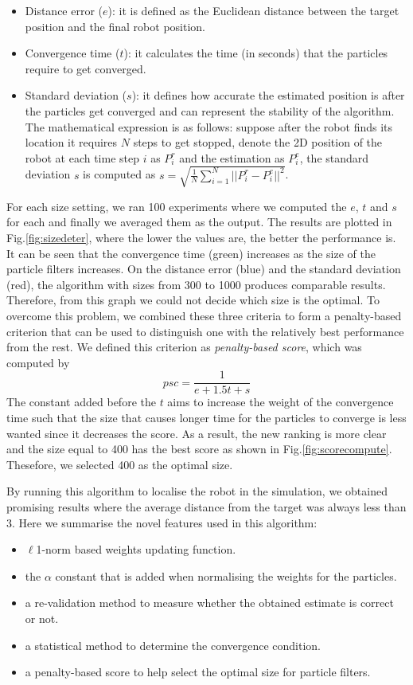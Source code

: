 \begin{itemize}
  \item Distance error ($e$): it is defined as the Euclidean distance between the target position and the final robot position.
  \item Convergence time ($t$): it calculates the time (in seconds) that the particles require to get converged.
  \item Standard deviation ($s$): it defines how accurate the estimated position is after the particles get converged and can represent the stability of the algorithm. The mathematical expression is as follows: suppose after the robot finds its location it requires $N$ steps to get stopped, denote the 2D position of the robot at each time step $i$ as $P^{r}_{i}$ and the estimation as $P^{e}_{i}$, the standard deviation $s$ is computed as $s = \sqrt{ \frac{1}{N}\sum_{i=1}^{N}||P^{r}_{i} - P^{e}_{i}||^{2} }$.
\end{itemize}

For each size setting, we ran 100 experiments where we computed the $e$, $t$ and $s$ for each and finally we averaged them as the output. The results are plotted in Fig.\ref{fig:sizedeter}, where the lower the values are, the better the performance is. It can be seen that the convergence time (green) increases as the size of the particle filters increases. On the distance error (blue) and the standard deviation (red), the algorithm with sizes from 300 to 1000 produces comparable results. Therefore, from this graph we could not decide which size is the optimal. To overcome this problem, we combined these three criteria to form a penalty-based criterion that can be used to distinguish one with the relatively best performance from the rest. We defined this criterion as {\itshape penalty-based score}, which was computed by $$psc = \frac{1}{e+1.5t+s}$$ The constant added before the $t$ aims to increase the weight of the convergence time such that the size that causes longer time for the particles to converge is less wanted since it decreases the score. As a result, the new ranking is more clear and the size equal to 400 has the best score as shown in Fig.\ref{fig:scorecompute}. Thesefore, we selected 400 as the optimal size.

By running this algorithm to localise the robot in the simulation, we obtained promising results where the average distance from the target was always less than 3. Here we summarise the novel features used in this algorithm:

\begin{itemize}
  \item $\ell$1-norm based weights updating function.
  \item the $\alpha$ constant that is added when normalising the weights for the particles.
  \item a re-validation method to measure whether the obtained estimate is correct or not.
  \item a statistical method to determine the convergence condition.
  \item a penalty-based score to help select the optimal size for particle filters.
\end{itemize}

